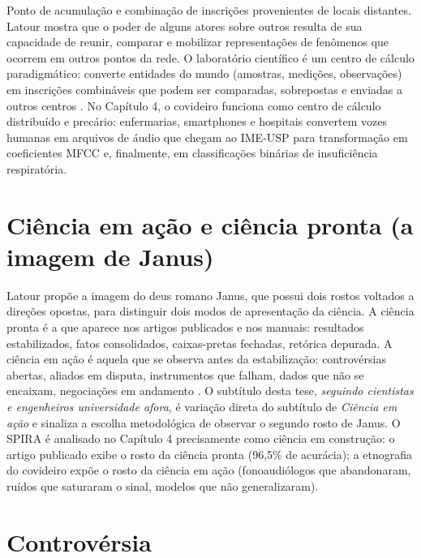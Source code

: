\begin{description}
Ponto de acumulação e combinação de inscrições provenientes de locais distantes. Latour mostra que o poder de alguns atores sobre outros resulta de sua capacidade de reunir, comparar e mobilizar representações de fenômenos que ocorrem em outros pontos da rede. O laboratório científico é um centro de cálculo paradigmático: converte entidades do mundo (amostras, medições, observações) em inscrições combináveis que podem ser comparadas, sobrepostas e enviadas a outros centros \parencite{Latour1990Drawing}. No Capítulo 4, o covideiro funciona como centro de cálculo distribuído e precário: enfermarias, smartphones e hospitais convertem vozes humanas em arquivos de áudio que chegam ao IME-USP para transformação em coeficientes MFCC e, finalmente, em classificações binárias de insuficiência respiratória.

\bigskip

\section*{Ciência em ação e ciência pronta (a imagem de Janus)}

Latour propõe a imagem do deus romano Janus, que possui dois rostos voltados a direções opostas, para distinguir dois modos de apresentação da ciência. A ciência pronta é a que aparece nos artigos publicados e nos manuais: resultados estabilizados, fatos consolidados, caixas-pretas fechadas, retórica depurada. A ciência em ação é aquela que se observa antes da estabilização: controvérsias abertas, aliados em disputa, instrumentos que falham, dados que não se encaixam, negociações em andamento \parencite[cap.~1]{Latour2011CienciaEmAcao}. O subtítulo desta tese, \textit{seguindo cientistas e engenheiros universidade afora}, é variação direta do subtítulo de \textit{Ciência em ação} e sinaliza a escolha metodológica de observar o segundo rosto de Janus. O SPIRA é analisado no Capítulo 4 precisamente como ciência em construção: o artigo publicado exibe o rosto da ciência pronta (96,5\% de acurácia); a etnografia do covideiro expõe o rosto da ciência em ação (fonoaudiólogos que abandonaram, ruídos que saturaram o sinal, modelos que não generalizaram).

\bigskip

\section*{Controvérsia}


\end{description}
